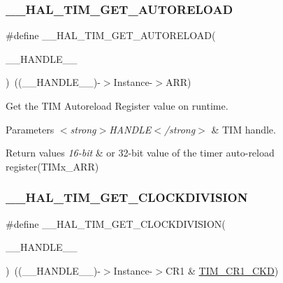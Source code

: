 \subsubsection{\texorpdfstring{\+\_\+\+\_\+\+H\+A\+L\+\_\+\+T\+I\+M\+\_\+\+G\+E\+T\+\_\+\+A\+U\+T\+O\+R\+E\+L\+O\+AD}{\_\_HAL\_TIM\_GET\_AUTORELOAD}}
{\footnotesize\ttfamily \#define \+\_\+\+\_\+\+H\+A\+L\+\_\+\+T\+I\+M\+\_\+\+G\+E\+T\+\_\+\+A\+U\+T\+O\+R\+E\+L\+O\+AD(\begin{DoxyParamCaption}\item[{}]{\+\_\+\+\_\+\+H\+A\+N\+D\+L\+E\+\_\+\+\_\+ }\end{DoxyParamCaption})~((\+\_\+\+\_\+\+H\+A\+N\+D\+L\+E\+\_\+\+\_\+)-\/$>$Instance-\/$>$A\+RR)}



Get the T\+IM Autoreload Register value on runtime. 


\begin{DoxyParams}{Parameters}
{\em $<$strong$>$\+H\+A\+N\+D\+L\+E$<$/strong$>$} & T\+IM handle. \\
\hline
\end{DoxyParams}

\begin{DoxyRetVals}{Return values}
{\em 16-\/bit} & or 32-\/bit value of the timer auto-\/reload register(\+T\+I\+Mx\+\_\+\+A\+R\+R) \\
\hline
\end{DoxyRetVals}
\mbox{\label{group___t_i_m___exported___macros_gae6bc91bb5940bce52828c690f24001b8}} 
\subsubsection{\texorpdfstring{\+\_\+\+\_\+\+H\+A\+L\+\_\+\+T\+I\+M\+\_\+\+G\+E\+T\+\_\+\+C\+L\+O\+C\+K\+D\+I\+V\+I\+S\+I\+ON}{\_\_HAL\_TIM\_GET\_CLOCKDIVISION}}
{\footnotesize\ttfamily \#define \+\_\+\+\_\+\+H\+A\+L\+\_\+\+T\+I\+M\+\_\+\+G\+E\+T\+\_\+\+C\+L\+O\+C\+K\+D\+I\+V\+I\+S\+I\+ON(\begin{DoxyParamCaption}\item[{}]{\+\_\+\+\_\+\+H\+A\+N\+D\+L\+E\+\_\+\+\_\+ }\end{DoxyParamCaption})~((\+\_\+\+\_\+\+H\+A\+N\+D\+L\+E\+\_\+\+\_\+)-\/$>$Instance-\/$>$C\+R1 \& \hyperlink{group___peripheral___registers___bits___definition_gacacc4ff7e5b75fd2e4e6b672ccd33a72}{T\+I\+M\+\_\+\+C\+R1\+\_\+\+C\+KD})}



